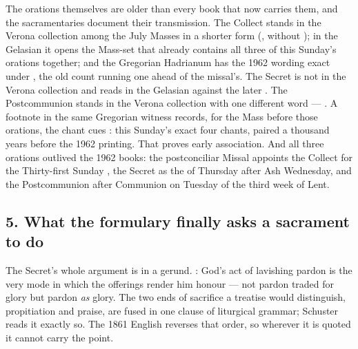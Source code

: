 The orations themselves are older than every book that now carries them, and
the sacramentaries document their transmission. The Collect stands in the
Verona collection among the July Masses in a shorter form (,
without ); in the Gelasian it opens the Mass-set that
already contains all three of this Sunday's orations together; and the
Gregorian Hadrianum has the 1962 wording exact under , the old count running one ahead of the missal's. The Secret is
not in the Verona collection and reads  in the Gelasian
against the later . The Postcommunion stands in the Verona
collection with one different word --- . A footnote in the same Gregorian witness records, for the Mass
before those orations, the chant cues : this
Sunday's exact four chants, paired a thousand years before the 1962 printing.
That proves early association. And all three
orations outlived the 1962 books: the postconciliar Missal appoints the
Collect for the Thirty-first Sunday , the Secret as the
 of Thursday after Ash Wednesday, and the Postcommunion
after Communion on Tuesday of the third week of Lent.

\subsection*{5. What the formulary finally asks a sacrament to do}

The Secret's whole argument is in a gerund. : God's act of lavishing pardon is the very
mode in which the offerings render him honour --- not pardon traded for glory
but pardon \textit{as} glory. The two ends of sacrifice a treatise would
distinguish, propitiation and praise, are fused in one clause of liturgical
grammar; Schuster reads it exactly so. The 1861 English reverses that order,
so wherever it is quoted it cannot carry the point.

